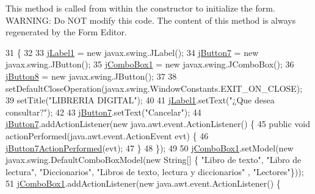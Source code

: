 This method is called from within the constructor to initialize the form. W\+A\+R\+N\+I\+NG\+: Do N\+OT modify this code. The content of this method is always regenerated by the Form Editor. 
\begin{DoxyCode}
31                                   \{
32 
33         \mbox{\hyperlink{class_interfaz_package_1_1_interfaz_consulta_aeeb159dc49a945f8285bc200316b7b38}{jLabel1}} = \textcolor{keyword}{new} javax.swing.JLabel();
34         \mbox{\hyperlink{class_interfaz_package_1_1_interfaz_consulta_afd5c627098a6c6bb116f8120486ba5bd}{jButton7}} = \textcolor{keyword}{new} javax.swing.JButton();
35         \mbox{\hyperlink{class_interfaz_package_1_1_interfaz_consulta_adc5bff154b6dcb8682ea4727b7783ee5}{jComboBox1}} = \textcolor{keyword}{new} javax.swing.JComboBox();
36         \mbox{\hyperlink{class_interfaz_package_1_1_interfaz_consulta_a82083645edf763690351c2f33263a8a1}{jButton8}} = \textcolor{keyword}{new} javax.swing.JButton();
37 
38         setDefaultCloseOperation(javax.swing.WindowConstants.EXIT\_ON\_CLOSE);
39         setTitle(\textcolor{stringliteral}{"LIBRERIA DIGITAL"});
40 
41         \mbox{\hyperlink{class_interfaz_package_1_1_interfaz_consulta_aeeb159dc49a945f8285bc200316b7b38}{jLabel1}}.setText(\textcolor{stringliteral}{"¿Que desea consultar?"});
42 
43         \mbox{\hyperlink{class_interfaz_package_1_1_interfaz_consulta_afd5c627098a6c6bb116f8120486ba5bd}{jButton7}}.setText(\textcolor{stringliteral}{"Cancelar"});
44         \mbox{\hyperlink{class_interfaz_package_1_1_interfaz_consulta_afd5c627098a6c6bb116f8120486ba5bd}{jButton7}}.addActionListener(\textcolor{keyword}{new} java.awt.event.ActionListener() \{
45             \textcolor{keyword}{public} \textcolor{keywordtype}{void} actionPerformed(java.awt.event.ActionEvent evt) \{
46                 \mbox{\hyperlink{class_interfaz_package_1_1_interfaz_consulta_abd82ed50489881b74e9832dfdd4e82a1}{jButton7ActionPerformed}}(evt);
47             \}
48         \});
49 
50         \mbox{\hyperlink{class_interfaz_package_1_1_interfaz_consulta_adc5bff154b6dcb8682ea4727b7783ee5}{jComboBox1}}.setModel(\textcolor{keyword}{new} javax.swing.DefaultComboBoxModel(\textcolor{keyword}{new} String[] \{ \textcolor{stringliteral}{"Libro de texto"},
       \textcolor{stringliteral}{"Libro de lectura"}, \textcolor{stringliteral}{"Diccionarios"}, \textcolor{stringliteral}{"Libros de texto, lectura y diccionarios"} , \textcolor{stringliteral}{"Lectores"}\}));
51         \mbox{\hyperlink{class_interfaz_package_1_1_interfaz_consulta_adc5bff154b6dcb8682ea4727b7783ee5}{jComboBox1}}.addActionListener(\textcolor{keyword}{new} java.awt.event.ActionListener() \{

\end{DoxyCode}
